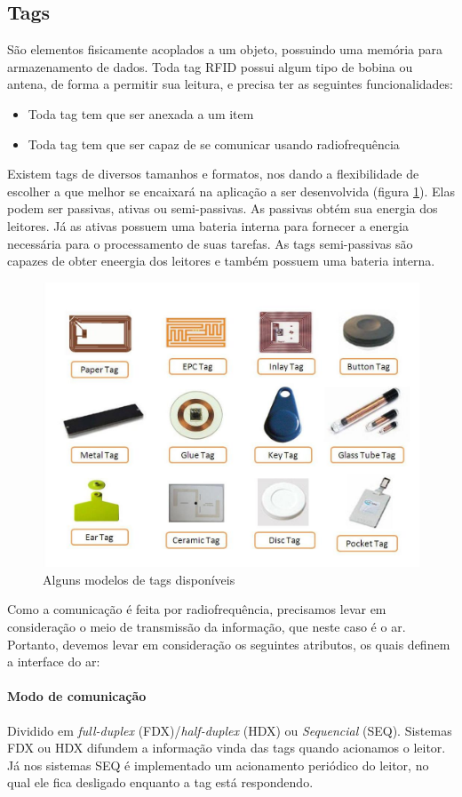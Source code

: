\documentclass[a4paper,12pt,titlepage]{article}
\begin{document}
	\subsection{Tags}
	São elementos fisicamente acoplados a um objeto, possuindo uma memória para armazenamento de dados. Toda tag RFID possui algum tipo de bobina ou antena, de forma a permitir sua leitura, e precisa ter as seguintes funcionalidades:
	
		\begin{itemize}
			\item Toda tag tem que ser anexada a um item
			\item Toda tag tem que ser capaz de se comunicar usando radiofrequência
		\end{itemize}
	

	 Existem tags de diversos tamanhos e formatos, nos dando a flexibilidade de escolher a que melhor se encaixará na aplicação a ser desenvolvida (figura \ref{fig:rfidtags}). Elas podem ser passivas, ativas ou semi-passivas. As passivas obtém sua energia dos leitores. Já as ativas possuem uma bateria interna para fornecer a energia necessária para o processamento de suas tarefas.	
	 As tags semi-passivas são capazes de obter eneergia dos leitores e também possuem uma bateria interna.
	 
		\begin{figure}[h!]
			\centering
			\includegraphics[width=0.5\linewidth]{rfidtagas}
			\caption{Alguns modelos de tags disponíveis}
			\label{fig:rfidtags}
		\end{figure}
	
	Como a comunicação é feita por radiofrequência, precisamos levar em consideração o meio de transmissão da informação, que neste caso é o ar. Portanto, devemos levar em consideração os seguintes atributos, os quais definem a interface do ar:   
	
	\paragraph{Modo de comunicação} Dividido em \textit{full-duplex} (FDX)/\textit{half-duplex} (HDX) ou \textit{Sequencial} (SEQ). Sistemas FDX ou HDX difundem a informação vinda das tags quando acionamos o leitor. Já nos sistemas SEQ é implementado um acionamento periódico do leitor, no qual ele fica desligado enquanto a tag está respondendo.	
\end{document}
